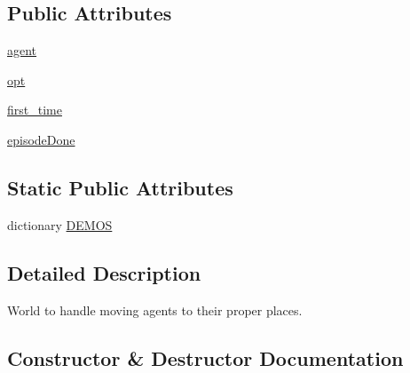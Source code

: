 \subsection*{Public Attributes}
\begin{DoxyCompactItemize}
\item 
\hyperlink{classparlai_1_1chat__service_1_1tasks_1_1overworld__demo_1_1worlds_1_1MessengerOverworld_a0466d551ecaa370b9cd4399d2df674de}{agent}
\item 
\hyperlink{classparlai_1_1chat__service_1_1tasks_1_1overworld__demo_1_1worlds_1_1MessengerOverworld_a56ded4b12c29ec7afe535fa465e2f060}{opt}
\item 
\hyperlink{classparlai_1_1chat__service_1_1tasks_1_1overworld__demo_1_1worlds_1_1MessengerOverworld_a8d15a01f05649c59054dd7983008876b}{first\+\_\+time}
\item 
\hyperlink{classparlai_1_1chat__service_1_1tasks_1_1overworld__demo_1_1worlds_1_1MessengerOverworld_a6770e1e0fb6d4ffcc595a15123dda18c}{episode\+Done}
\end{DoxyCompactItemize}
\subsection*{Static Public Attributes}
\begin{DoxyCompactItemize}
\item 
dictionary \hyperlink{classparlai_1_1chat__service_1_1tasks_1_1overworld__demo_1_1worlds_1_1MessengerOverworld_a2c4d88de708555ff42d4508a25f191be}{D\+E\+M\+OS}
\end{DoxyCompactItemize}


\subsection{Detailed Description}
\begin{DoxyVerb}World to handle moving agents to their proper places.
\end{DoxyVerb}
 

\subsection{Constructor \& Destructor Documentation}
\mbox{\label{classparlai_1_1chat__service_1_1tasks_1_1overworld__demo_1_1worlds_1_1MessengerOverworld_a8d781f73d10b44cf73c9127588747ff1}} 
